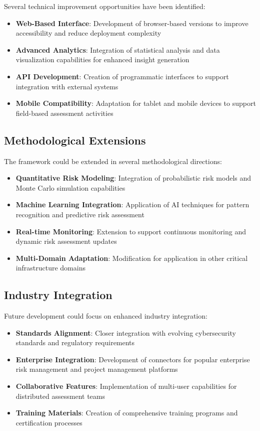 \documentclass[binding=0.6cm]{sapthesis}
\begin{document}
Several technical improvement opportunities have been identified:

\begin{itemize}
    \item \textbf{Web-Based Interface}: Development of browser-based versions to improve accessibility and reduce deployment complexity
    \item \textbf{Advanced Analytics}: Integration of statistical analysis and data visualization capabilities for enhanced insight generation
    \item \textbf{API Development}: Creation of programmatic interfaces to support integration with external systems
    \item \textbf{Mobile Compatibility}: Adaptation for tablet and mobile devices to support field-based assessment activities
\end{itemize}

\subsection{Methodological Extensions}

The framework could be extended in several methodological directions:

\begin{itemize}
    \item \textbf{Quantitative Risk Modeling}: Integration of probabilistic risk models and Monte Carlo simulation capabilities
    \item \textbf{Machine Learning Integration}: Application of AI techniques for pattern recognition and predictive risk assessment
    \item \textbf{Real-time Monitoring}: Extension to support continuous monitoring and dynamic risk assessment updates
    \item \textbf{Multi-Domain Adaptation}: Modification for application in other critical infrastructure domains
\end{itemize}

\subsection{Industry Integration}

Future development could focus on enhanced industry integration:

\begin{itemize}
    \item \textbf{Standards Alignment}: Closer integration with evolving cybersecurity standards and regulatory requirements
    \item \textbf{Enterprise Integration}: Development of connectors for popular enterprise risk management and project management platforms
    \item \textbf{Collaborative Features}: Implementation of multi-user capabilities for distributed assessment teams
    \item \textbf{Training Materials}: Creation of comprehensive training programs and certification processes
\end{itemize}
\end{document}
